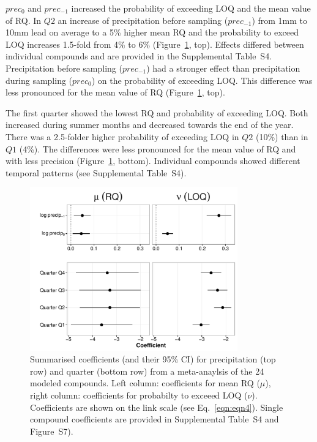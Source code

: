 \documentclass[journal=esthag,manuscript=article]{achemso}
\begin{document}
$prec_{0}$ and $prec_{-1}$ increased the probability of exceeding LOQ and the mean value of RQ.
In $Q2$ an increase of precipitation before sampling ($prec_{-1}$) from 1mm to 10mm lead on average to a 5\% higher mean RQ and the probability to exceed LOQ increases 1.5-fold from 4\% to 6\% (Figure~\ref{fig:fig5}, top). %
Effects differed between individual compounds and are provided in the Supplemental Table~S4.
Precipitation before sampling ($prec_{-1}$) had a stronger effect than precipitation during sampling ($prec_{0}$) on the probability of exceeding LOQ. 
This difference was less pronounced for the mean value of RQ (Figure~\ref{fig:fig5}, top). 

The first quarter showed the lowest RQ and probability of exceeding LOQ.
Both increased during summer months and decreased towards the end of the year.
There was a 2.5-folder higher probability of exceeding LOQ in $Q2$ (10\%) than in $Q1$ (4\%).
The differences were less pronounced for the mean value of RQ and with less precision (Figure~\ref{fig:fig5}, bottom). 
Individual compounds showed different temporal patterns (see Supplemental Table~S4). 


\begin{figure}[ht]
  \includegraphics[width=0.8\textwidth]{figure5.pdf}
  \caption{Summarised coefficients (and their 95\% CI) for precipitation (top row) and quarter (bottom row) from a meta-anaylsis of the 24 modeled compounds. Left column: coefficients for mean RQ ($\mu$), right column: coefficients for probabilty to exceeed LOQ ($\nu$). 
  Coefficients are shown on the link scale (see Eq.~\ref{eqn:eqn4}).
  Single compound coefficients are provided in Supplemental Table~S4 and Figure~S7).
  }
  \label{fig:fig5}
\end{figure}
\end{document}
